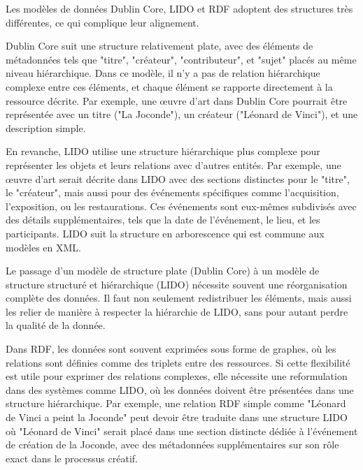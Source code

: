 Les modèles de données Dublin Core, LIDO et RDF adoptent des structures très différentes, ce qui complique leur alignement.\newline

Dublin Core suit une structure relativement plate, avec des éléments de métadonnées tels que "titre", "créateur", "contributeur", et "sujet" placés au même niveau hiérarchique. Dans ce modèle, il n'y a pas de relation hiérarchique complexe entre ces éléments, et chaque élément se rapporte directement à la ressource décrite. Par exemple, une œuvre d’art dans Dublin Core pourrait être représentée avec un titre ("La Joconde"), un créateur ("Léonard de Vinci"), et une description simple.\newline

En revanche, LIDO utilise une structure hiérarchique plus complexe pour représenter les objets et leurs relations avec d'autres entités. Par exemple, une œuvre d’art serait décrite dans LIDO avec des sections distinctes pour le "titre", le "créateur", mais aussi pour des événements spécifiques comme l’acquisition, l’exposition, ou les restaurations. Ces événements sont eux-mêmes subdivisés avec des détails supplémentaires, tels que la date de l’événement, le lieu, et les participants. LIDO suit la structure en arborescence qui est commune aux modèles en XML.\newline

Le passage d’un modèle de structure plate (Dublin Core) à un modèle de structure structuré et hiérarchique (LIDO) nécessite souvent une réorganisation complète des données. Il faut non seulement redistribuer les éléments, mais aussi les relier de manière à respecter la hiérarchie de LIDO, sans pour autant perdre la qualité de la donnée. \newline

Dans RDF, les données sont souvent exprimées sous forme de graphes, où les relations sont définies comme des triplets entre des ressources. Si cette flexibilité est utile pour exprimer des relations complexes, elle nécessite une reformulation dans des systèmes comme LIDO, où les données doivent être présentées dans une structure hiérarchique. Par exemple, une relation RDF simple comme "Léonard de Vinci a peint la Joconde" peut devoir être traduite dans une structure LIDO où "Léonard de Vinci" serait placé dans une section distincte dédiée à l'événement de création de la Joconde, avec des métadonnées supplémentaires sur son rôle exact dans le processus créatif.\newline

